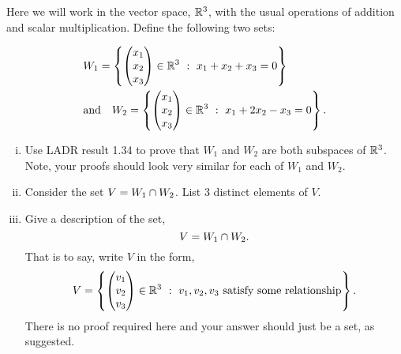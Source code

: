 \begin{question}\label{que:SubspaceSpecific}
	\normalfont
	
	Here we will work in the vector space, ${\mathbb R}^3$, with the usual operations of addition and scalar multiplication.  Define the following two sets:
	
    \begin{equation}
        \begin{aligned}
            &W_1 = \left\{ \colvecthree{x_1}{x_2}{x_3}\in \real^3\ :\ x_1 + x_2 + x_3 = 0 \right\}\\
            &\text{and}\ \ \ 
            W_2 = \left\{ \colvecthree{x_1}{x_2}{x_3}\in \real^3\ :\ x_1 + 2x_2 - x_3 = 0 \right\}.
        \end{aligned}
    \end{equation}
	
	\begin{enumerate}[(i)]
		\item Use LADR result 1.34 to prove that $W_1$ and $W_2$ are both subspaces of ${\mathbb R}^3$.  Note, your proofs should look very similar for each of $W_1$ and $W_2$.
		
		\item Consider the set $V=W_1\cap W_2$.  List 3 distinct elements of $V$.
		
		\item Give a description of the set, 
		\begin{equation}
			V= W_1 \cap W_2.
		\end{equation}
		That is to say, write $V$ in the form,
		\begin{equation}
			V = \left\{ \begin{pmatrix} v_1\\ v_2\\ v_3\end{pmatrix}\in{\mathbb R}^3\ :\ v_1, v_2, v_3\ \text{satisfy some relationship} \right\}.
		\end{equation}
		There is no proof required here and your answer should just be a set, as suggested.
	\end{enumerate}
\end{question}

